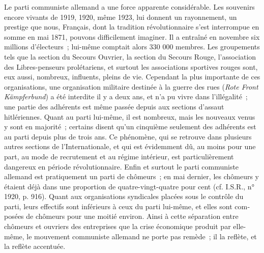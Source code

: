 \documentclass[french,twoside]{book} %
\begin{document}
Le parti communiste allemand a une force apparente considérable. Les souvenirs encore vivants de 1919, 1920, même 1923, lui donnent un rayonne­ment, un prestige que nous, Français, dont la tradition révolutionnaire s'est interrompue en somme en mai 1871, pouvons difficilement imaginer. Il a entraîné en novembre six millions d'électeurs ; lui-même comptait alors 330 000 membres. Les groupements tels que la section du Secours Ouvrier, la section du Secours Rouge, l'association des Libres-penseurs prolétariens, et surtout les associations sportives rouges sont, eux aussi, nombreux, influents, pleins de vie. Cependant la plus importante de ces organisations, une organi­sation militaire destinée à la guerre des rues ({\itshape Rote Front Kämpferbund}) a été interdite il y a deux ans, et n'a pu vivre dans l'illégalité ; une partie des adhérents est même passée depuis aux sections d'assaut hitlériennes. Quant au parti lui-même, il est nombreux, mais les nouveaux venus y sont en majorité ; certains disent qu'un cinquième seulement des adhérents est au parti depuis plus de trois ans. Ce phénomène, qui se retrouve dans plusieurs autres sections de l'Internationale, et qui est évidemment dû, au moins pour une part, au mode de recrutement et au régime intérieur, est particulièrement dangereux en période révolutionnaire. Enfin et surtout le parti communiste allemand est pratiquement un parti de chômeurs ; en mai dernier, les chômeurs y étaient déjà dans une proportion de quatre-vingt-quatre pour cent (cf. I.S.R., n° 1920, p. 916). Quant aux organisations syndicales placées sous le contrôle du parti, leurs effectifs sont inférieurs à ceux du parti lui-même, et elles sont com­posées de chômeurs pour une moitié environ. Ainsi à cette séparation entre chômeurs et ouvriers des entreprises que la crise économique produit par elle-même, le mouvement communiste allemand ne porte pas remède ; il la reflète, et la reflète accentuée.\par
\end{document}
